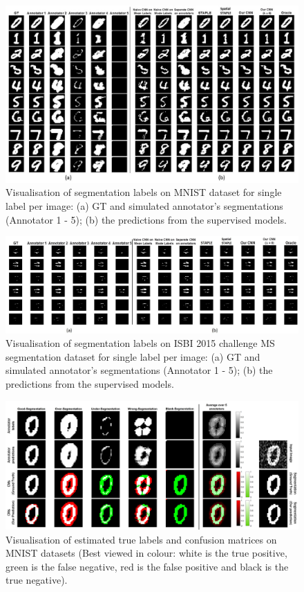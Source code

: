 \begin{figure}[h]
    \centering
    \includegraphics[width=\linewidth]{chapter_8/picture9.jpg}
    \caption{Visualisation of segmentation labels on MNIST dataset for single label per image: (a) GT and simulated annotator’s segmentations (Annotator 1 - 5); (b) the predictions from the supervised models.}
    \label{MNIST segmentation results}
\end{figure}

\begin{figure}[h]
    \centering
    \includegraphics[width=\linewidth]{chapter_8/picture8.jpg}
    \caption{Visualisation of segmentation labels on ISBI 2015 challenge MS segmentation dataset for single label per image: (a) GT and simulated annotator’s segmentations (Annotator 1 - 5); (b) the predictions from the supervised models.}
    \label{MS segmentation results}
\end{figure}

\begin{figure}[h]
    \centering
    \includegraphics[width=\linewidth]{chapter_8/picture91.jpg}
    \caption{Visualisation of estimated true labels and confusion matrices on MNIST datasets (Best viewed in colour: white is the true positive, green is the false negative, red is the false positive and black is the true negative).}
    \label{CMs of MNIST}
\end{figure}

